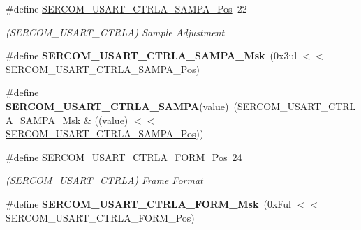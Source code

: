 \begin{DoxyCompactItemize}
\item 
\hypertarget{group___s_a_m_l21___s_e_r_c_o_m_gaf908d1b3dd997b4458deb9d3711be15b}{}\#define \hyperlink{group___s_a_m_l21___s_e_r_c_o_m_gaf908d1b3dd997b4458deb9d3711be15b}{S\+E\+R\+C\+O\+M\+\_\+\+U\+S\+A\+R\+T\+\_\+\+C\+T\+R\+L\+A\+\_\+\+S\+A\+M\+P\+A\+\_\+\+Pos}~22\label{group___s_a_m_l21___s_e_r_c_o_m_gaf908d1b3dd997b4458deb9d3711be15b}

\begin{DoxyCompactList}\small\item\em (S\+E\+R\+C\+O\+M\+\_\+\+U\+S\+A\+R\+T\+\_\+\+C\+T\+R\+L\+A) Sample Adjustment \end{DoxyCompactList}\item 
\hypertarget{group___s_a_m_l21___s_e_r_c_o_m_ga207407cf020acc2f174a489b8bb5201d}{}\#define {\bfseries S\+E\+R\+C\+O\+M\+\_\+\+U\+S\+A\+R\+T\+\_\+\+C\+T\+R\+L\+A\+\_\+\+S\+A\+M\+P\+A\+\_\+\+Msk}~(0x3ul $<$$<$ S\+E\+R\+C\+O\+M\+\_\+\+U\+S\+A\+R\+T\+\_\+\+C\+T\+R\+L\+A\+\_\+\+S\+A\+M\+P\+A\+\_\+\+Pos)\label{group___s_a_m_l21___s_e_r_c_o_m_ga207407cf020acc2f174a489b8bb5201d}

\item 
\hypertarget{group___s_a_m_l21___s_e_r_c_o_m_gaec47e632fb96d43ff42b36110c2ff181}{}\#define {\bfseries S\+E\+R\+C\+O\+M\+\_\+\+U\+S\+A\+R\+T\+\_\+\+C\+T\+R\+L\+A\+\_\+\+S\+A\+M\+P\+A}(value)~(S\+E\+R\+C\+O\+M\+\_\+\+U\+S\+A\+R\+T\+\_\+\+C\+T\+R\+L\+A\+\_\+\+S\+A\+M\+P\+A\+\_\+\+Msk \& ((value) $<$$<$ \hyperlink{group___s_a_m_l21___s_e_r_c_o_m_gaf908d1b3dd997b4458deb9d3711be15b}{S\+E\+R\+C\+O\+M\+\_\+\+U\+S\+A\+R\+T\+\_\+\+C\+T\+R\+L\+A\+\_\+\+S\+A\+M\+P\+A\+\_\+\+Pos}))\label{group___s_a_m_l21___s_e_r_c_o_m_gaec47e632fb96d43ff42b36110c2ff181}

\item 
\hypertarget{group___s_a_m_l21___s_e_r_c_o_m_ga66b6fc1b386596d5426091b7e85171fa}{}\#define \hyperlink{group___s_a_m_l21___s_e_r_c_o_m_ga66b6fc1b386596d5426091b7e85171fa}{S\+E\+R\+C\+O\+M\+\_\+\+U\+S\+A\+R\+T\+\_\+\+C\+T\+R\+L\+A\+\_\+\+F\+O\+R\+M\+\_\+\+Pos}~24\label{group___s_a_m_l21___s_e_r_c_o_m_ga66b6fc1b386596d5426091b7e85171fa}

\begin{DoxyCompactList}\small\item\em (S\+E\+R\+C\+O\+M\+\_\+\+U\+S\+A\+R\+T\+\_\+\+C\+T\+R\+L\+A) Frame Format \end{DoxyCompactList}\item 
\hypertarget{group___s_a_m_l21___s_e_r_c_o_m_gaf5d5903c3974c1e086bb35ca7ea48c63}{}\#define {\bfseries S\+E\+R\+C\+O\+M\+\_\+\+U\+S\+A\+R\+T\+\_\+\+C\+T\+R\+L\+A\+\_\+\+F\+O\+R\+M\+\_\+\+Msk}~(0x\+Ful $<$$<$ S\+E\+R\+C\+O\+M\+\_\+\+U\+S\+A\+R\+T\+\_\+\+C\+T\+R\+L\+A\+\_\+\+F\+O\+R\+M\+\_\+\+Pos)\label{group___s_a_m_l21___s_e_r_c_o_m_gaf5d5903c3974c1e086bb35ca7ea48c63}


\end{DoxyCompactItemize}
